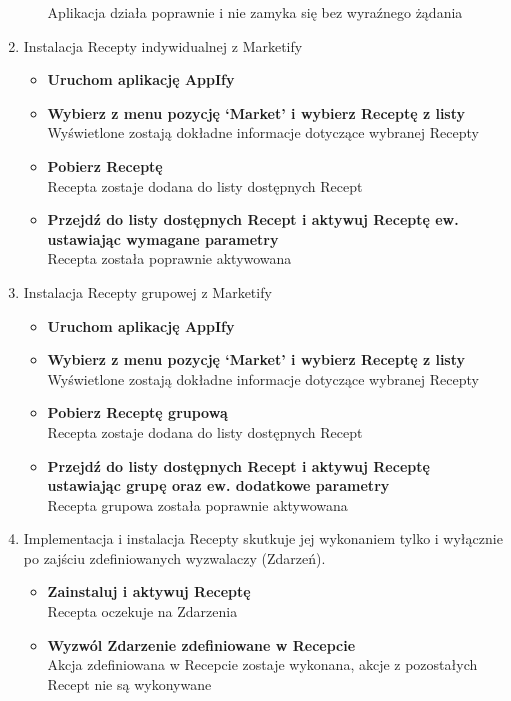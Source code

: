 \documentclass[11pt,a4paper,polish,thesis]{dcsbook}
\begin{document}
\begin{enumerate}
\begin{itemize}
Aplikacja działa poprawnie i nie zamyka się bez wyraźnego żądania
\end{itemize}
\item
Instalacja Recepty indywidualnej z Marketify
\begin{itemize}
\item \textbf{Uruchom aplikację AppIfy}\\
\item \textbf{Wybierz z menu pozycję ‘Market’ i wybierz Receptę z listy}\\
Wyświetlone zostają dokładne informacje dotyczące wybranej Recepty
\item \textbf{Pobierz Receptę}\\
Recepta zostaje dodana do listy dostępnych Recept
\item \textbf{Przejdź do listy dostępnych Recept i aktywuj Receptę ew. ustawiając wymagane parametry}\\
Recepta została poprawnie aktywowana
\end{itemize}
\item
Instalacja Recepty grupowej z Marketify
\begin{itemize}
\item \textbf{Uruchom aplikację AppIfy}\\
\item \textbf{Wybierz z menu pozycję ‘Market’ i wybierz Receptę z listy}\\
Wyświetlone zostają dokładne informacje dotyczące wybranej Recepty
\item \textbf{Pobierz Receptę grupową}\\
Recepta zostaje dodana do listy dostępnych Recept
\item \textbf{Przejdź do listy dostępnych Recept i aktywuj Receptę ustawiając grupę oraz ew. dodatkowe parametry}\\
Recepta grupowa została poprawnie aktywowana
\end{itemize}
\item
Implementacja i instalacja Recepty skutkuje jej wykonaniem tylko i wyłącznie po zajściu zdefiniowanych wyzwalaczy (Zdarzeń).
\begin{itemize}
\item \textbf{Zainstaluj i aktywuj Receptę}\\
Recepta oczekuje na Zdarzenia
\item \textbf{Wyzwól Zdarzenie zdefiniowane w Recepcie}\\
Akcja zdefiniowana w Recepcie zostaje wykonana, akcje z pozostałych Recept nie są wykonywane

\end{itemize}
\end{enumerate}
\end{document}

